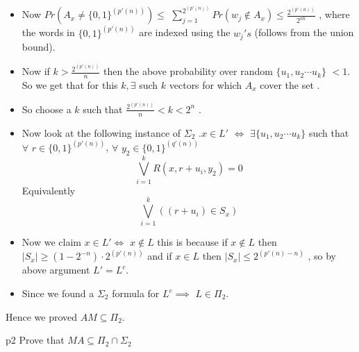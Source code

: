 \documentclass[a4paper, 11pt]{article}
\begin{document}
{\begin{itemize}
		\item Now $Pr(A_{x} \neq \{0,1\}^{(p'(n))})\leq $ $\sum\limits_{j=1}^{2^{(p'(n))}} Pr(w_{j} \notin A_{x}) \leq \frac{2^{(p'(n))}}{2^{nk}}$ , where the words in $\{0,1\}^{(p'(n))}$ are indexed using the $w_{j}'s$ (follows from the union bound).
		\item Now if $k>\frac{2^{(p'(n))}}{n} $ then the above probability over random $\{u_{1},u_{2}\cdots u_{k}\}$ $<1$. So we get that for this $k, \exists $ such $k$ vectors for which $A_{x}$ cover the set .
		\item So choose a $k$ such that $\frac{2^{(p'(n))}}{n}<k<2^{n}$ .
		\item Now look at the following instance of $\Sigma_2$ .$x \in L'$ $\iff$ $\exists \{u_1,u_2\cdots u_k\}$ such that $\forall $ $r\in \{0,1\}^{(p'(n))}$, $\forall$ $y_2 \in \{0,1\}^{(q'(n))}$ 
		$$\bigvee_{i=1}^{k} R(x,r+u_i,y_2)=0$$
		Equivalently
			$$ \bigvee_{i=1}^{k} ((r+u_i) \in S_x)$$
		\item Now we claim $x\in L' \iff$ $x\notin L$ this is because if $x \notin L $ then  $|S_{x}| \geq (1-2^{-n})\cdot2^{(p'(n))}  $ and if $x \in L$ then $|S_x|\leq 2^{(p'(n)-n)}$ , so by above argument $L' = L^c$.
		\item Since we found a $\Sigma_2 $ formula for $L^c \implies $  $L \in \Pi_2$.
		\end{itemize}
		Hence we proved $AM \subseteq \Pi_2$.
	}
	
	

	
	\begin{problem}{%
		}{p2%
		}
		Prove that $MA\subseteq \Pi_2\cap \Sigma_2$
	\end{problem}
	
\end{document}
